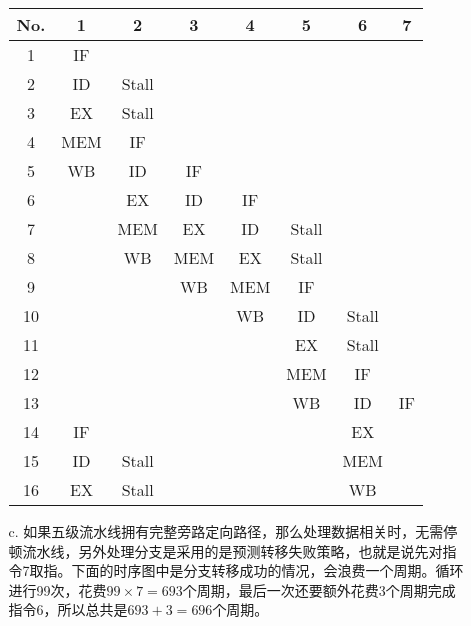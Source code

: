 \documentclass[UTF8,zihao=-4]{ctexart}
\begin{document}
\begin{enumerate}
\begin{enumerate}
			\begin{center}
				\begin{tabular}{|c|c|c|c|c|c|c|c|}
					\hline
					No. &  1  &   2   &  3  &  4  &   5   &   6   & 7  \\ \hline
					 1  & IF  &       &     &     &       &       &    \\
					 2  & ID  & Stall &     &     &       &       &    \\
					 3  & EX  & Stall &     &     &       &       &    \\
					 4  & MEM &  IF   &     &     &       &       &    \\
					 5  & WB  &  ID   & IF  &     &       &       &    \\
					 6  &     &  EX   & ID  & IF  &       &       &    \\
					 7  &     &  MEM  & EX  & ID  & Stall &       &    \\
					 8  &     &  WB   & MEM & EX  & Stall &       &    \\
					 9  &     &       & WB  & MEM &  IF   &       &    \\
					10  &     &       &     & WB  &  ID   & Stall &    \\
					11  &     &       &     &     &  EX   & Stall &    \\
					12  &     &       &     &     &  MEM  &  IF   &    \\
					13  &     &       &     &     &  WB   &  ID   & IF \\ \hline
					14  & IF  &       &     &     &       &  EX   &    \\
					15  & ID  & Stall &     &     &       &  MEM  &    \\
					16  & EX  & Stall &     &     &       &  WB   &    \\ \hline
				\end{tabular}
			\end{center}
			\item[c.]如果五级流水线拥有完整旁路定向路径，那么处理数据相关时，无需停顿流水线，另外处理分支是采用的是预测转移失败策略，也就是说先对指令7取指。下面的时序图中是分支转移成功的情况，会浪费一个周期。循环进行99次，花费$99\times 7=693$个周期，最后一次还要额外花费3个周期完成指令6，所以总共是$693+3=696$个周期。


\end{enumerate}
\end{enumerate}
\end{document}
